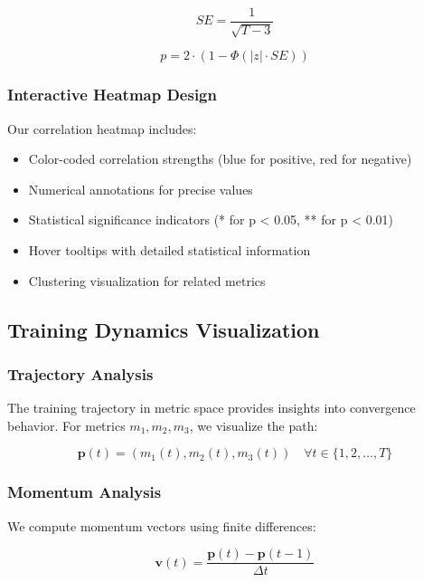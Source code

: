 \documentclass[12pt,a4paper]{article}
\begin{document}
\begin{equation}
    SE = \frac{1}{\sqrt{T - 3}}
\end{equation}

\begin{equation}
    p = 2 \cdot (1 - \Phi(|z| \cdot SE))
\end{equation}

\subsubsection{Interactive Heatmap Design}

Our correlation heatmap includes:
\begin{itemize}
    \item Color-coded correlation strengths (blue for positive, red for negative)
    \item Numerical annotations for precise values
    \item Statistical significance indicators (* for p < 0.05, ** for p < 0.01)
    \item Hover tooltips with detailed statistical information
    \item Clustering visualization for related metrics
\end{itemize}

\subsection{Training Dynamics Visualization}
\label{subsec:dynamics}

\subsubsection{Trajectory Analysis}

The training trajectory in metric space provides insights into convergence behavior. For metrics \( m_1, m_2, m_3 \), we visualize the path:

\begin{equation}
    \mathbf{p}(t) = (m_1(t), m_2(t), m_3(t)) \quad \forall t \in \{1, 2, \dots, T\}
\end{equation}

\subsubsection{Momentum Analysis}

We compute momentum vectors using finite differences:

\begin{equation}
    \mathbf{v}(t) = \frac{\mathbf{p}(t) - \mathbf{p}(t-1)}{\Delta t}
\end{equation}
\end{document}
